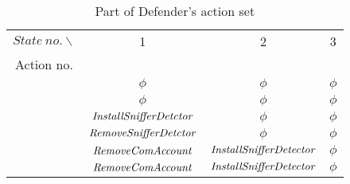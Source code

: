 \documentclass[10pt, conference, compsocconf]{IEEEtran}
\begin{document}
\begin{table}[h]
\caption{\label{defenderaction} Part of Defender's action set}
\centering
\scriptsize
{}
\newcommand{\Rowna}{\stepcounter{Rownumbera}\theRownumbera}
\renewcommand{\multirowsetup}{\centering}
\begin{tabular}{cccc}\hline
$State~no.\backslash$  &  1      &  2       & 3         \\
Action no.             &         &          &           \\\hline
\Rowna                 & $\phi$  &  $\phi$  & $\phi$    \\
\Rowna                 & $\phi$  &  $\phi$  & $\phi$    \\
\Rowna                 & ${\it InstallSnifferDetctor}$ &$\phi$ &$\phi$\\
\Rowna                 & ${\it RemoveSnifferDetctor}$  &$\phi$ &$\phi$\\
\Rowna    &${\it RemoveComAccount}$ &${\it InstallSnifferDetector}$  &   $\phi$\\
\Rowna    & ${\it RemoveComAccount}$ &${\it InstallSnifferDetector}$  &   $\phi$\\
\hline
\end{tabular}
\end{table}
\end{document}
